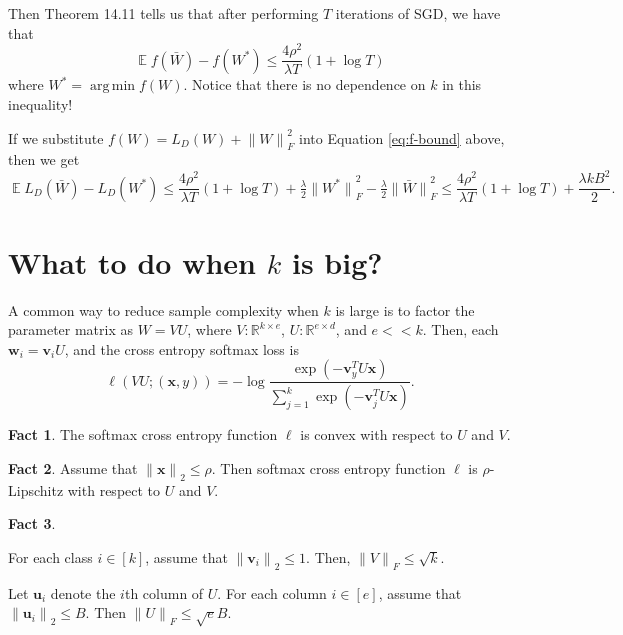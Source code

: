 \documentclass[10pt]{article}
\theoremstyle{definition}
\newtheorem{fact}{Fact}
\newcommand{\R}{\mathbb R}
\DeclareMathOperator{\E}{\mathbb E}
\DeclareMathOperator*{\argmin}{arg\,min}
\newcommand{\trans}[1]{{#1}^{T}}
\newcommand{\loss}{\ell}
\newcommand{\vv}{\mathbf v}
\newcommand{\uu}{\mathbf u}
\newcommand{\w}{\mathbf w}
\newcommand{\x}{\mathbf x}
\newcommand{\ltwo}[1]{{\lVert {#1} \rVert}_2}
\newcommand{\lF}[1]{{\lVert {#1} \rVert}_F}
\begin{document}
\vspace{3in}
\noindent
Then Theorem 14.11 tells us that after performing $T$ iterations of SGD, we have that
\begin{equation}
    \label{eq:f-bound}
    \E f(\bar W) - f(W^*) \le \frac{4\rho^2}{\lambda T} ( 1 + \log T)
\end{equation}
where $W^* = \argmin f(W)$.
Notice that there is no dependence on $k$ in this inequality!

If we substitute $f(W)=L_D(W)+\lF{W}^2$ into Equation \ref{eq:f-bound} above,
then we get
\begin{equation}
    \label{eq:f-bound}
    \E L_D(\bar W) - L_D(W^*) 
    \le \frac{4\rho^2}{\lambda T} ( 1 + \log T) + \tfrac\lambda2\lF{W^*}^2 - \tfrac\lambda2\lF{\bar W}^2
    \le \frac{4\rho^2}{\lambda T} ( 1 + \log T) + \frac{\lambda k B^2}{2}
    .
\end{equation}

\newpage
\section{What to do when $k$ is big?}

A common way to reduce sample complexity when $k$ is large is to factor the parameter matrix as $W = VU$,
where $V : \R ^ {k \times e}$, $U : \R^{e \times d}$, and $e<\!<\!k$.
Then, each $\w_i = \vv_i U$, and the cross entropy softmax loss is
\begin{equation}
    \ell(VU;(\x,y)) = - \log \frac {\exp(-\trans\vv_y U \x)}{\sum_{j=1}^k \exp(-\trans \vv_j U \x)}
    .
\end{equation}


\begin{fact}
    The softmax cross entropy function $\loss$ is convex with respect to $U$ and $V$.
\end{fact}

\begin{fact}
    Assume that $\ltwo{\x}\le \rho$.
    Then softmax cross entropy function $\loss$ is $\rho$-Lipschitz with respect to $U$ and $V$.
\end{fact}

\begin{fact}
    \begin{enumerate*}[label=(\roman*)]
        \item
    For each class $i \in [k]$, assume that $\ltwo{\vv_i} \le 1$.
    Then, $\lF{V} \le \sqrt k$.
        \item
    Let $\uu_i$ denote the $i$th column of $U$.
    For each column $i \in [e]$, assume that $\ltwo{\uu_i} \le B$.
    Then $\lF{U} \le \sqrt eB$.
    \end{enumerate*}
\end{fact}
\end{document}
